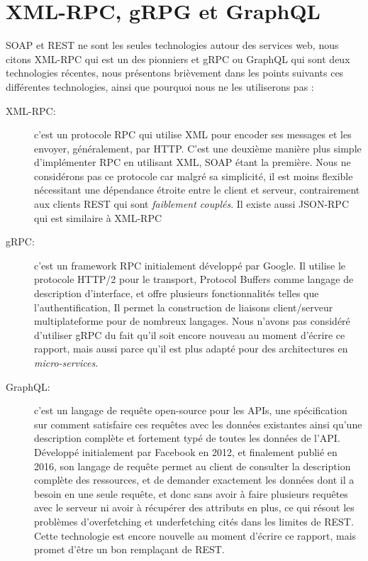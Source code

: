 \section{XML-RPC, gRPG et GraphQL}
SOAP et REST ne sont les seules technologies autour des services web, nous citons XML-RPC qui est un des pionniers et gRPC ou GraphQL qui sont deux technologies récentes, nous présentons brièvement dans les points suivants ces différentes technologies, ainsi que pourquoi nous ne les utiliserons pas :
\begin{description}
\item[XML-RPC:] c'est un protocole RPC
qui utilise XML pour encoder ses messages et les envoyer, généralement, par HTTP.
C'est une deuxième manière plus simple d'implémenter RPC en utilisant XML, SOAP étant la première. Nous ne considérons pas ce protocole car malgré sa simplicité, il est moins flexible nécessitant une dépendance étroite entre le client et serveur, contrairement aux clients REST qui sont \emph{faiblement couplés}.
Il existe aussi JSON-RPC qui est similaire à XML-RPC\cite{XMLRPC}

\item[gRPC: ] c'est un framework RPC initialement développé par Google. Il utilise le protocole HTTP/2 pour le transport, Protocol Buffers comme langage de description d'interface, et offre plusieurs fonctionnalités telles que l'authentification, Il permet la construction de liaisons client/serveur multiplateforme pour de nombreux langages.
Nous n'avons pas considéré d'utiliser gRPC du fait qu'il soit encore nouveau au moment d'écrire ce rapport, mais aussi parce qu'il est plus adapté pour des architectures en \emph{micro-services}.\cite{gRPC}

\item[GraphQL:] c'est un langage de requête open-source pour les APIs, une spécification sur comment satisfaire ces requêtes avec les données existantes ainsi qu'une description complète et fortement typé de toutes les données de l'API.
Développé initialement par Facebook en 2012, et finalement publié en 2016, son langage de requête permet au client de consulter la description complète des ressources, et de demander exactement les données dont il a besoin en une seule requête, et donc sans avoir à faire plusieurs requêtes avec le serveur ni avoir à récupérer des attributs en plus, ce qui résout les problèmes d'overfetching et underfetching cités dans les limites de REST.
Cette technologie est encore nouvelle au moment d'écrire ce rapport, mais promet d'être un bon remplaçant de REST.



\end{description}
